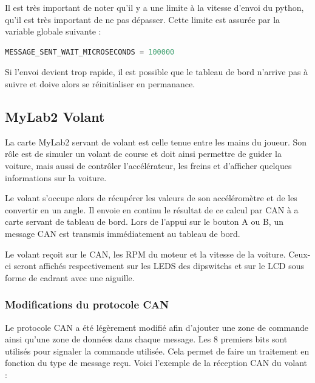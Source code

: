 \documentclass[french, 11pt]{article}
\begin{document}
			Il est très important de noter qu'il y a une limite à la vitesse d'envoi du python, qu'il est très important de ne pas dépasser. Cette limite est assurée par la variable globale suivante : 

\begin{lstlisting}[language=python, caption=Variable de ralentissement de l'envoi des données par le python]
MESSAGE_SENT_WAIT_MICROSECONDS = 100000
\end{lstlisting}

		Si l'envoi devient trop rapide, il est possible que le tableau de bord n'arrive pas à suivre et doive alors se réinitialiser en permanance.

        \subsection{MyLab2 Volant}

		La carte MyLab2 servant de volant est celle tenue entre les mains du joueur. Son rôle est de simuler un volant de course et doit ainsi permettre de guider la voiture, mais aussi de contrôler l'accélérateur, les freins et d'afficher quelques informations sur la voiture.

        Le volant s'occupe alors de récupérer les valeurs de son accéléromètre et de les convertir en un angle. Il envoie en continu le résultat de ce calcul par CAN à a carte servant de tableau de bord. Lors de l'appui sur le bouton A ou B, un message CAN est transmis immédiatement au tableau de bord. 
		
		Le volant reçoit sur le CAN, les RPM du moteur et la vitesse de la voiture. Ceux-ci seront affichés respectivement sur les LEDS des dipswitchs et sur le LCD sous forme de cadrant avec une aiguille. 

		\subsubsection{Modifications du protocole CAN}
		\label{CAN}

		Le protocole CAN a été légèrement modifié afin d'ajouter une zone de commande ainsi qu'une zone de données dans chaque message. Les 8 premiers bits sont utilisés pour signaler la commande utilisée. Cela permet de faire un traitement en fonction du type de message reçu. Voici l'exemple de la réception CAN du volant : 
\end{document}
